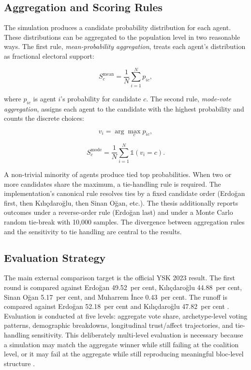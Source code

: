 \documentclass[12pt,a4paper]{report}
\begin{document}
\subsection{Aggregation and Scoring Rules}
\label{sec:scoring}

The simulation produces a candidate probability distribution for each agent. These distributions can be aggregated to the population level in two reasonable ways. The first rule, \emph{mean-probability aggregation}, treats each agent's distribution as fractional electoral support:

\begin{equation}
S_c^{\mathrm{mean}} = \frac{1}{N}\sum_{i=1}^{N} p_{ic},
\label{eq:mean}
\end{equation}

where $p_{ic}$ is agent $i$'s probability for candidate $c$. The second rule, \emph{mode-vote aggregation}, assigns each agent to the candidate with the highest probability and counts the discrete choices:

\begin{equation}
v_i = \arg\max_{c} p_{ic},
\label{eq:mode_argmax}
\end{equation}

\begin{equation}
S_c^{\mathrm{mode}} = \frac{1}{N}\sum_{i=1}^{N}\mathbb{1}(v_i=c).
\label{eq:mode_share}
\end{equation}

A non-trivial minority of agents produce tied top probabilities. When two or more candidates share the maximum, a tie-handling rule is required. The implementation's canonical rule resolves ties by a fixed candidate order (Erdoğan first, then Kılıçdaroğlu, then Sinan Oğan, etc.). The thesis additionally reports outcomes under a reverse-order rule (Erdoğan last) and under a Monte Carlo random tie-break with 10{,}000 samples. The divergence between aggregation rules and the sensitivity to tie handling are central to the results.

\subsection{Evaluation Strategy}
\label{sec:evaluation_strategy}

The main external comparison target is the official YSK 2023 result. The first round is compared against Erdoğan 49.52~per cent, Kılıçdaroğlu 44.88~per cent, Sinan Oğan 5.17~per cent, and Muharrem İnce 0.43~per cent. The runoff is compared against Erdoğan 52.18~per cent and Kılıçdaroğlu 47.82~per cent \citep{ysk2023}. Evaluation is conducted at five levels: aggregate vote share, archetype-level voting patterns, demographic breakdowns, longitudinal trust/affect trajectories, and tie-handling sensitivity. This deliberately multi-level evaluation is necessary because a simulation may match the aggregate winner while still failing at the coalition level, or it may fail at the aggregate while still reproducing meaningful bloc-level structure \citep{kang2026dynamok,kreutner2026ep}.
\end{document}

